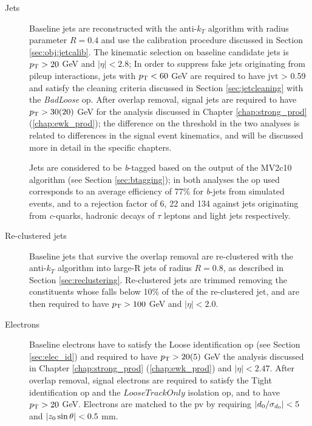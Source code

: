 \begin{description}

\item[Jets] Baseline jets are reconstructed with the anti-$k_T$ algorithm 
with radius parameter $R=0.4$ 
and use the calibration procedure discussed in Section \ref{sec:obj:jetcalib}. 
The kinematic selection on baseline candidate jets is  $p_{\rm T} > 20$ GeV and $|\eta|<2.8$; 
In order to suppress fake jets originating from pileup interactions, jets with $p_{\rm T}<60$ GeV are required to have \gls{jvt} > 0.59 and satisfy the cleaning criteria discussed in Section \ref{sec:jetcleaning} with the \textit{BadLoose} \gls{op}.
After overlap removal, signal jets are required to have $p_{\rm T}>30 (20)$ GeV for the analysis discussed in Chapter \ref{chap:strong_prod} (\ref{chap:ewk_prod}); the difference on the \pt threshold 
in the two analyses is related to differences in the signal event kinematics, and will be discussed more in detail in the specific chapters.

Jets are considered to be \textit{b}-tagged based on the output of the MV2c10 algorithm (see Section \ref{sec:btagging}); in both analyses the \gls{op} used corresponds to an average efficiency of 77\% for \textit{b}-jets from simulated  
\ttbar events, and to a rejection factor of 6, 22 and 134 against jets originating from \textit{c}-quarks, hadronic decays of $\tau$ leptons and light jets respectively. 


\item[Re-clustered jets] Baseline jets that survive the overlap removal are re-clustered with the anti-$k_T$ algorithm into large-R jets of radius $R=0.8$, as described in Section \ref{sec:reclustering}. 
Re-clustered jets are trimmed removing the constituents whose \pt falls below 10\% of the \pt of the re-clustered jet, and are then required to have $p_{\rm T}>100$ GeV and $|\eta|<2.0$.

\item[Electrons] Baseline electrons have to satisfy the Loose identification \gls{op} (see Section \ref{sec:elec_id}) and required to have $p_{\rm T} > 20 (5)$ GeV the analysis discussed in Chapter \ref{chap:strong_prod} (\ref{chap:ewk_prod}) and $|\eta|<2.47$. 
After overlap removal, signal electrons are required to satisfy the Tight identification \gls{op} and the $LooseTrackOnly$ isolation \gls{op}, and  to have $p_{\rm T} > 20$ GeV.
Electrons are matched to the \gls{pv} by requiring $|{d_0}/\sigma_{d_0}| < 5$ and  $|{z_0} \sin\theta| < 0.5$ mm.



\end{description}
